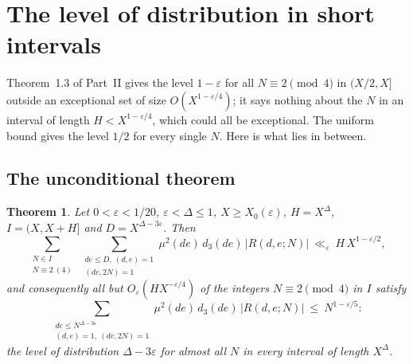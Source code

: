 \documentclass[11pt]{amsart}
\newtheorem{theorem}{Theorem}[section]
\theoremstyle{remark}
\newcommand{\e}{\varepsilon}
\begin{document}
\section{The level of distribution in short intervals}\label{sec:short}

Theorem~1.3 of Part~II gives the level $1-\e$ for all $N\equiv2\pmod4$ in $(X/2,X]$ outside an exceptional set of size $O(X^{1-\e/4})$; it says nothing about the $N$ in an interval of length $H<X^{1-\e/4}$, which could all be exceptional. The uniform bound gives the level $1/2$ for every single $N$. Here is what lies in between.

\subsection{The unconditional theorem}
\begin{theorem}\label{thm:short}
Let $0<\e<1/20$, $\e<\Delta\le1$, $X\ge X_0(\e)$, $H=X^\Delta$, $I=(X,X+H]$ and $D=X^{\Delta-3\e}$. Then
\[
\sum_{\substack{N\in I\\ N\equiv2\ (4)}}\ \sum_{\substack{de\le D,\ (d,e)=1\\ (de,2N)=1}}\mu^2(de)\,d_3(de)\,|R(d,e;N)|\ \ll_\e\ H\,X^{1-\e/2},
\]
and consequently all but $O_\e(HX^{-\e/4})$ of the integers $N\equiv2\pmod4$ in $I$ satisfy
\[
\sum_{\substack{de\le N^{\Delta-3\e}\\ (d,e)=1,\ (de,2N)=1}}\mu^2(de)\,d_3(de)\,|R(d,e;N)|\ \le\ N^{1-\e/5}:
\]
the level of distribution $\Delta-3\e$ for almost all $N$ in every interval of length $X^\Delta$.
\end{theorem}
\end{document}
